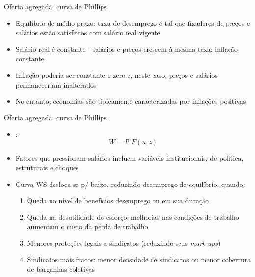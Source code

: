 \documentclass[10pt]{beamer}
\begin{document}
\begin{frame}
    {Oferta agregada: curva de Phillips}
    \begin{itemize}
        \item Equilíbrio de médio prazo: taxa de desemprego é tal que fixadores de preços e salários estão satisfeitos com salário real vigente\bigskip
        \item Salário real é constante - salários e preços crescem à mesma taxa: inflação constante\bigskip
        \item Inflação poderia ser constante e zero e, neste caso, preços e salários permaneceriam inalterados\bigskip
        \item No entanto, economias são tipicamente caracterizadas por inflações positivas
    \end{itemize}
\end{frame}

\begin{frame}
    {Oferta agregada: curva de Phillips}
    \begin{itemize}
        \item {}:
        \begin{equation}
            W = P^e F(u,z)
        \end{equation}
        \item Fatores que pressionam salários incluem variáveis institucionais, de política, estruturais e choques\bigskip
        \item Curva WS desloca-se p/ baixo, reduzindo desemprego de equilíbrio, quando:\medskip
        \begin{enumerate}
            \item Queda no nível de benefícios desemprego ou em sua duração\medskip
            \item Queda na desutilidade do esforço: melhorias nas condições de trabalho aumentam o custo da perda de trabalho\medskip
            \item Menores proteções legais a sindicatos (reduzindo seus \emph{mark-ups})\medskip
            \item Sindicatos mais fracos: menor densidade de sindicatos ou menor cobertura de barganhas coletivas
        \end{enumerate}
    \end{itemize}
\end{frame}
\end{document}
